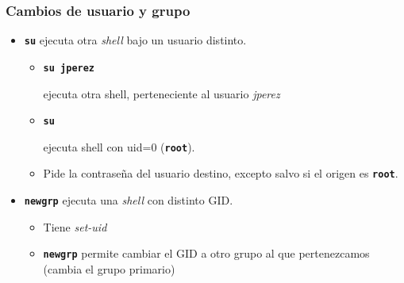 \documentclass[ucs]{beamer}
\begin{document}
\begin{frame}[fragile]
  \frametitle{Cambios de usuario y grupo}
  \begin{itemize}
    \item \texttt{\textbf{su}} ejecuta otra \emph{shell} bajo un usuario distinto.

  \begin{itemize}
        \item \texttt{\textbf{su jperez}} 

ejecuta otra shell, perteneciente al usuario \emph{jperez}
        \item \texttt{\textbf{su}} 

ejecuta shell con uid=0 (\texttt{\textbf{root}}).

        \item Pide la contraseña del usuario destino, excepto  salvo si el origen es \texttt{\textbf{root}}.

  \end{itemize}


    \item \texttt{\textbf{newgrp}} ejecuta una \emph{shell} con distinto GID.
      \begin{itemize}
        \item Tiene \emph{set-uid} 
        \item  \texttt{\textbf{newgrp}} permite cambiar el GID a otro grupo al que
          pertenezcamos  (cambia el grupo primario)
      \end{itemize}
  \end{itemize}
\end{frame}
\end{document}
